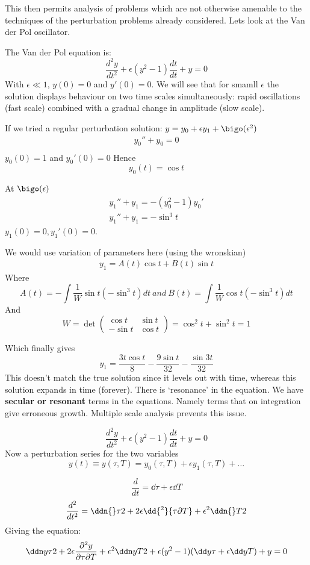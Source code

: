 \documentclass{/home/janmebows/Documents/LatexTemplates/myassignment}
\begin{document}
This then permits analysis of problems which are not otherwise amenable to the techniques of the perturbation problems already considered. Lets look at the Van der Pol oscillator.


The Van der Pol equation is:
\[\frac{d^2y}{dt^2} + \epsilon(y^2-1) \frac{dt}{dt} + y = 0\]
With $\epsilon \ll1$, $y(0)=0$ and $y'(0)=0$. We will see that for smamll $\epsilon$ the solution displays behaviour on two time scales simultaneously: rapid oscillations (fast scale) combined with a gradual change in amplitude (slow scale).

If we tried a regular perturbation solution:
$y=y_0 + \epsilon y_1 + \bigo(\epsilon^2)$
\begin{align*}
    y_0'' + y_0 = 0\\
\end{align*}
$y_0(0)=1$ and $y_0'(0)=0$
Hence
\[y_0(t) = \cos t\]

At $\bigo(\epsilon)$
\begin{align*}
    y_1'' + y_1 = -(y_0^2 - 1) y_0'\\
    y_1'' + y_1 = -\sin^3 t
\end{align*}
$y_1(0)=0, y_1'(0)=0$.

We would use variation of parameters here (using the wronskian)
\begin{align*}
    y_1 = A(t)\cos t + B(t)\sin t
\end{align*}
Where
\[A(t) = -\int \frac1W \sin t(-\sin^3 t) dt \ and \ B(t) = \int \frac1W \cos t(-\sin^3 t) dt \]
And 
\[W = \det\begin{pmatrix}
    \cos t & \sin t\\-\sin t&\cos t
\end{pmatrix} = \cos^2 t + \sin^2 t = 1 \]

Which finally gives
\[y_1 = \frac{3t\cos t}{8} - \frac{9\sin t}{32} - \frac{\sin 3t}{32}\]
This doesn't match the true solution since it levels out with time, whereas this solution expands in time (forever). There is `resonance' in the equation. We have \textbf{secular or resonant} terms in the equations. Namely terms that on integration give erroneous growth. Multiple scale analysis prevents this issue.

 \[\frac{d^2y}{dt^2} + \epsilon(y^2-1) \frac{dt}{dt} + y = 0\]
Now a perturbation series for the two variables
\[y(t) \equiv y(\tau,T) = y_0(\tau,T) + \epsilon y_1(\tau,T) + \ldots\]

\[\frac{d}{dt} = \dd{}\tau + \epsilon \dd{}T\]
\[\frac{d^2}{dt^2} = \ddn{}\tau2 + 2\epsilon \dd{^2}{\tau\partial T} + \epsilon^2 \ddn{}T2\]
Giving the equation:
\[\ddn y\tau 2 + 2\epsilon \frac{\partial^2y}{\partial \tau \partial T} + \epsilon^2 \ddn yT2 + \epsilon(y^2 -1)(\dd y \tau + \epsilon \dd y T) + y = 0\]
\end{document}
